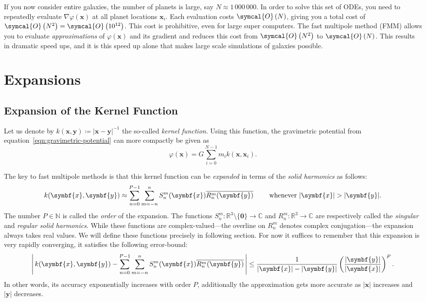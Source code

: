 \documentclass{scrbook}
\newcommand{\naturals}{\ensuremath{\mathbb{N}}}
\newcommand{\reals}{\ensuremath{\mathbb{R}}}
\newcommand{\complex}{\mathbb{C}}
\newcommand{\wholespace}{\ensuremath{\reals^3}}
\newcommand{\vv}[1]{\ensuremath{\symbf{#1}}} %
\newcommand{\bigO}[1]{\ensuremath{\symcal{O}\left({#1}\right)}}
\begin{document}
If you now consider entire galaxies, the number of planets is large, say
$N\approx 1\,000\,000$. In order to solve this set of ODEs, you need to
repeatedly evaluate $\nabla\varphi(\vv{x})$ at all planet locations
$\vv{x}_i$. Each evaluation costs \bigO{N}, giving you a total cost of
$\bigO{N^2}=\bigO{10^{12}}$. This cost is prohibitive, even for large super
computers. The fast multipole method (FMM) allows you to evaluate
\emph{approximations} of $\varphi(\vv{x})$ and its gradient and reduces this
cost from \bigO{N^2} to \bigO{N}. This results in dramatic speed ups, and it 
is this speed up alone that makes large scale simulations of galaxies possible.

\section{Expansions}
\subsection{Expansion of the Kernel Function}
Let us denote by $k(\vv{x},\vv{y})\coloneqq |\vv{x}-\vv{y}|^{-1}$ the so-called
\emph{kernel function}. Using this function, the gravimetric potential from
equation~\eqref{eqn:gravimetric-potential} can more compactly be given as
\begin{equation}\label{eqn:kgravimetric-potential}
\varphi(\vv{x})=G\sum_{i=0}^{N-1}m_i k(\vv{x},\vv{x}_i).
\end{equation}

The key to fast multipole methods is that this kernel function can be
\emph{expanded} in terms of the \emph{solid harmonics} as follows:
\begin{equation}\label{eqn:kernel-expansion}
k(\vv{x},\vv{y}) \approx
\sum_{n=0}^{P-1}\sum_{m=-n\vphantom{0}}^n
S_n^m(\vv{x})\overline{R_n^m(\vv{y})}
\qquad\text{ whenever }|\vv{x}| > |\vv{y}|.
\end{equation}
The number $P\in\naturals$ is called the \emph{order} of the expansion.
The functions $S_n^m:\wholespace \setminus \lbrace\vv{0}\rbrace\to\complex$ and
$R_n^m:\wholespace\to\complex$ are respectively called the \emph{singular} and
\emph{regular solid harmonics}. While these functions are complex-valued---the
overline on $R_n^m$ denotes complex conjugation---the expansion always takes
real values. We will define these functions precisely in following section. For
now it suffices to remember that this expansion is very rapidly converging, it
satisfies the following error-bound:\autocite[Theorem~3.2]{greengard1997}
\begin{equation}
\left|\,
k(\vv{x},\vv{y}) - 
\sum_{n=0}^{P-1}\sum_{m=-n\vphantom{0}}^n
S_n^m(\vv{x})\overline{R_n^m(\vv{y})}
\,\right|
\leq \frac{1}{|\vv{x}|-|\vv{y}|}\left(\frac{|\vv{y}|}{|\vv{x}|}\right)^P.
\end{equation}
In other words, its accuracy exponentially increases with order $P$,
additionally the approximation gets more accurate as $|\vv{x}|$ increases and
$|\vv{y}|$ decreases.
\end{document}
